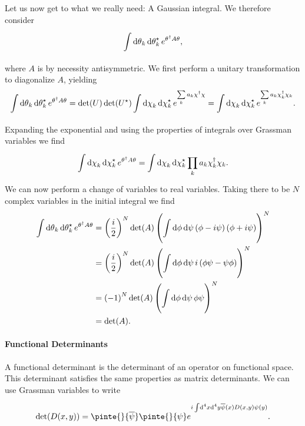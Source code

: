 Let us now get to what we really need: A Gaussian integral. We therefore consider
\begin{align*}
	\int\limits_{}^{}\dd{\theta}_{k}\dd{\theta}_{k}^{\star} e^{\theta^{\dagger} A\theta},
\end{align*}
where $A$ is by necessity antisymmetric. We first perform a unitary transformation to diagonalize $A$, yielding
\begin{align*}
	\int\limits_{}^{}\dd{\theta}_{k}\dd{\theta}_{k}^{\star} e^{\theta^{\dagger} A\theta} = \det(U)\det(U^{\star})\int\limits_{}^{}\dd{\chi}_{k}\dd{\chi}_{k}^{\star} e^{\sum\limits_{k}a_{k}\chi^{\dagger}\chi} = \int\limits_{}^{}\dd{\chi}_{k}\dd{\chi}_{k}^{\star} e^{\sum\limits_{k}a_{k}\chi_{k}^{\dagger}\chi_{k}}.
\end{align*}
Expanding the exponential and using the properties of integrals over Grassman variables we find
\begin{align*}
	\int\limits_{}^{}\dd{\chi}_{k}\dd{\chi}_{k}^{\star} e^{\theta^{\dagger} A\theta} = \int\limits_{}^{}\dd{\chi}_{k}\dd{\chi}_{k}^{\star} \prod\limits_{k}a_{k}\chi_{k}^{\dagger}\chi_{k}.
\end{align*}
We can now perform a change of variables to real variables. Taking there to be $N$ complex variables in the initial integral we find
\begin{align*}
	\int\limits_{}^{}\dd{\theta}_{k}\dd{\theta}_{k}^{\star} e^{\theta^{\dagger} A\theta} &= \left(\frac{i}{2}\right)^{N}\det(A)\left(\int\limits_{}^{}\dd{\phi}\dd{\psi}\left(\phi - i\psi\right)\left(\phi + i\psi\right)\right)^{N} \\
	&= \left(\frac{i}{2}\right)^{N}\det(A)\left(\int\limits_{}^{}\dd{\phi}\dd{\psi}i\left(\phi\psi - \psi\phi\right)\right)^{N} \\
	&= \left(-1\right)^{N}\det(A)\left(\int\limits_{}^{}\dd{\phi}\dd{\psi}\phi\psi\right)^{N} \\
	&= \det(A).
\end{align*}

\paragraph{Functional Determinants}
A functional determinant is the determinant of an operator on functional space. This determinant satisfies the same properties as matrix determinants. We can use Grassman variables to write
\begin{align*}
	\det(D(x, y)) = \pinte{}{\overline{\psi}}\pinte{}{\psi}e^{i\inte{}{}\dd[4]{x}\dd[4]{y}\overline{\psi}(x)D(x, y)\psi(y)}.
\end{align*}
